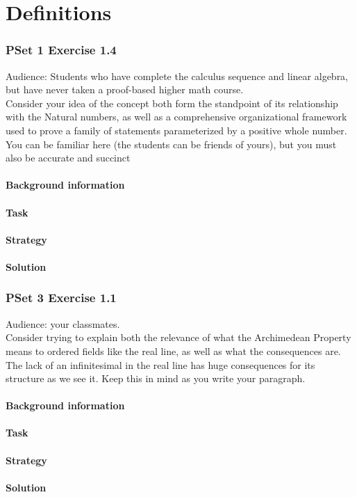 \documentclass[11 pt]{article}
\begin{document}
\part{Definitions}
\section{PSet 1 Exercise 1.4}
Audience: Students who have complete the calculus sequence and linear algebra, but have never taken a proof-based higher math course.\\
Consider your idea of the concept both form the standpoint of its relationship with the
Natural numbers, as well as a comprehensive organizational framework used to prove a family of
statements parameterized by a positive whole number. You can be familiar here (the students can be
friends of yours), but you must also be accurate and succinct
\begin{multicols*}{2} 
\subsection{Background information}
\subsection{Task}
\subsection{Strategy}
\columnbreak
\subsection{Solution}
\end{multicols*}
\pagebreak

\section{PSet 3 Exercise 1.1}
Audience: your classmates.\\
Consider trying to explain both the relevance of what the Archimedean Property means
to ordered fields like the real line, as well as what the consequences are. The lack of an infinitesimal in the real line has huge consequences for its structure as we see it. Keep this in mind as you write your paragraph.
\begin{multicols*}{2} 
\subsection{Background information}
\subsection{Task}
\subsection{Strategy}
\columnbreak
\subsection{Solution}
\end{multicols*}
\pagebreak
\end{document}
